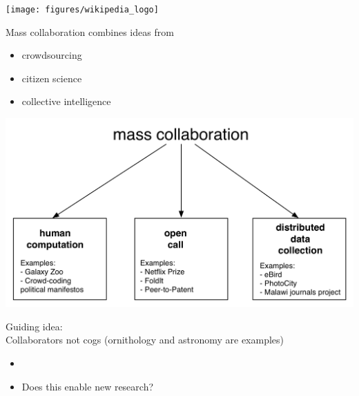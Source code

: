 \documentclass[aspectratio=169]{beamer}
\begin{document}
\begin{frame}

\begin{center}
\texttt{[image: figures/wikipedia\_logo]}
\end{center}

\end{frame}
\begin{frame}

Mass collaboration combines ideas from 
\begin{itemize}
\item crowdsourcing
\item citizen science
\item collective intelligence
\end{itemize}

\end{frame}
\begin{frame}

\begin{center}
\includegraphics[width=\textwidth]{figures/mass_collaboration_schematic}
\end{center}

\end{frame}
\begin{frame}

Guiding idea:\\
Collaborators not cogs (ornithology and astronomy are examples)

\end{frame}
\begin{frame}

\begin{itemize}
  \item{} 
  \item<2-> Does this enable new research?
\end{itemize}

\end{frame}
\end{document}
